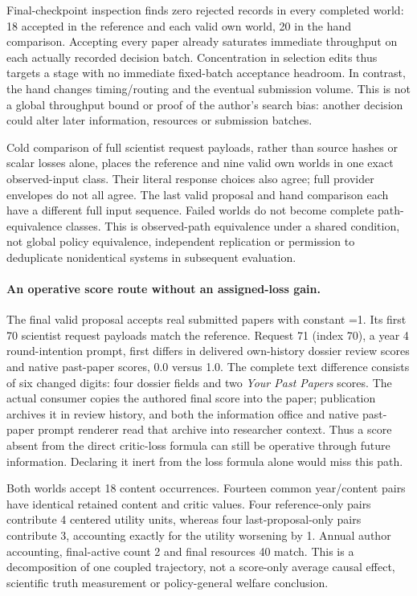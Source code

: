 Final-checkpoint inspection finds zero rejected records in every completed
world: 18 accepted in the reference and each valid own world, 20 in the hand
comparison. Accepting every paper already saturates immediate throughput on
each actually recorded decision batch. Concentration in selection edits thus
targets a stage with no immediate fixed-batch acceptance headroom. In contrast,
the hand changes timing/routing and the eventual submission volume. This is
not a global throughput bound or proof of the author's search bias: another
decision could alter later information, resources or submission batches.

Cold comparison of full scientist request payloads, rather than source hashes
or scalar losses alone, places the reference and nine valid own worlds in one
exact observed-input class. Their literal response choices also agree; full
provider envelopes do not all agree. The last valid proposal and hand comparison
each have a different full input sequence. Failed worlds do not become complete
path-equivalence classes. This is observed-path equivalence under a shared
condition, not global policy equivalence, independent replication or permission
to deduplicate nonidentical systems in subsequent evaluation.

\paragraph{An operative score route without an assigned-loss gain.}
The final valid proposal accepts real submitted papers with constant
=1. Its first 70 scientist request payloads match the reference.
Request 71 (index 70), a year 4 round-intention prompt, first differs in delivered
own-history dossier review scores and native past-paper scores, 0.0 versus 1.0.
The complete text difference consists of six changed digits: four dossier
fields and two \emph{Your Past Papers} scores. The actual consumer copies the
authored final score into the paper; publication archives it in review history,
and both the information office and native past-paper prompt renderer read
that archive into researcher context.
Thus a score absent from the direct critic-loss formula can still be operative
through future information. Declaring it inert from the loss formula alone
would miss this path.

Both worlds accept 18 content occurrences. Fourteen common year/content pairs
have identical retained content and critic values. Four reference-only pairs
contribute 4 centered utility units, whereas four last-proposal-only pairs
contribute 3, accounting exactly for the utility worsening by 1. Annual author
accounting, final-active count 2 and final resources 40 match. This is a decomposition
of one coupled trajectory, not a score-only average causal effect, scientific
truth measurement or policy-general welfare conclusion.

